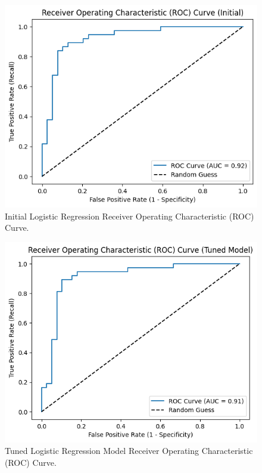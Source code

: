 \begin{figure}[htbp]
    \centerline{\includegraphics[width=0.8\columnwidth]{img/roc_initial.png}}
    \caption{Initial Logistic Regression Receiver Operating Characteristic (ROC) Curve.}\label{Initial Logistic Regression Receiver Operating Characteristic (ROC) Curve}
\end{figure}

\begin{figure}[htbp]
    \centerline{\includegraphics[width=0.8\columnwidth]{img/roc_tuned.png}}
    \caption{Tuned Logistic Regression Model Receiver Operating Characteristic (ROC) Curve.}\label{Tuned Logistic Regression Model Receiver Operating Characteristic (ROC) Curve}
\end{figure}

